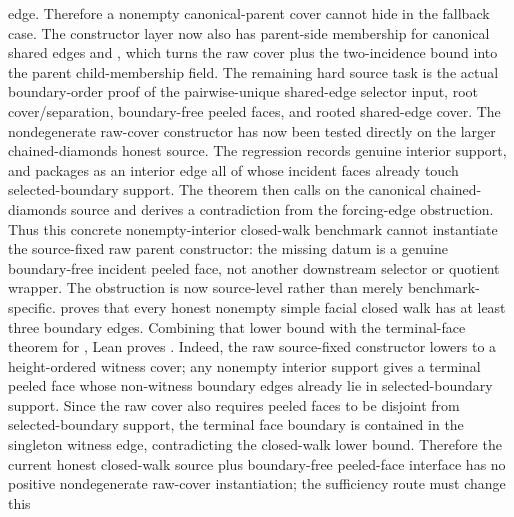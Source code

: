 \documentclass[11pt]{article}
\begin{document}
\begin{itemize}
edge.  Therefore a nonempty canonical-parent cover cannot hide in the fallback
case.  The constructor layer now also has parent-side membership for canonical
shared edges and
, which turns the
raw cover plus the two-incidence bound into the parent child-membership field.
The remaining hard source task is the actual boundary-order proof of the
pairwise-unique shared-edge selector input, root cover/separation,
boundary-free peeled faces, and rooted shared-edge cover.
The nondegenerate raw-cover constructor has now been tested directly on the
larger chained-diamonds honest source.  The regression
 records genuine
interior support, and
 packages
 as an interior edge all of whose incident faces already touch
selected-boundary support.  The theorem
then calls
on the canonical chained-diamonds source and derives a contradiction from the
forcing-edge obstruction.  Thus this concrete nonempty-interior closed-walk
benchmark cannot instantiate the source-fixed raw parent constructor: the
missing datum is a genuine boundary-free incident peeled face, not another
downstream selector or quotient wrapper.
The obstruction is now source-level rather than merely benchmark-specific.
proves that every honest nonempty simple facial closed walk has at least three
boundary edges.  Combining that lower bound with the terminal-face theorem for
, Lean proves
.
Indeed, the raw source-fixed constructor lowers to a height-ordered witness
cover; any nonempty interior support gives a terminal peeled face whose
non-witness boundary edges already lie in selected-boundary support.  Since
the raw cover also requires peeled faces to be disjoint from selected-boundary
support, the terminal face boundary is contained in the singleton witness edge,
contradicting the closed-walk lower bound.  Therefore the current honest
closed-walk source plus boundary-free peeled-face interface has no positive
nondegenerate raw-cover instantiation; the sufficiency route must change this

\end{itemize}
\end{document}
